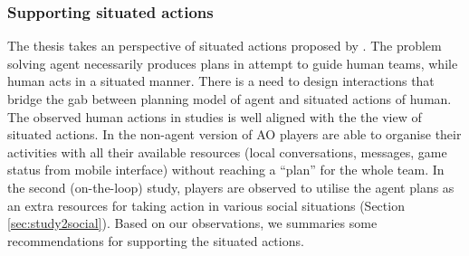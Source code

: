 \subsubsection{Supporting situated actions}\label{sec:conclusionSituatedAction}
The thesis takes an perspective of situated actions proposed by \cite{Suchman1987}. The problem solving agent necessarily produces plans in attempt to guide human teams, while human acts in a situated manner. There is a need to design interactions that bridge the gab between planning model of agent and situated actions of human. The observed human actions in studies is well aligned with the the view of situated actions. In the non-agent version of \ac{AO} players are able to organise their activities with all their available resources (local conversations, messages, game status from mobile interface) without reaching a ``plan'' for the whole team.  In the second (on-the-loop) study, players are observed to utilise the agent plans as an extra resources for taking action in various social situations (Section \ref{sec:study2social}). Based on our observations, we summaries some recommendations for supporting the situated actions. \\


